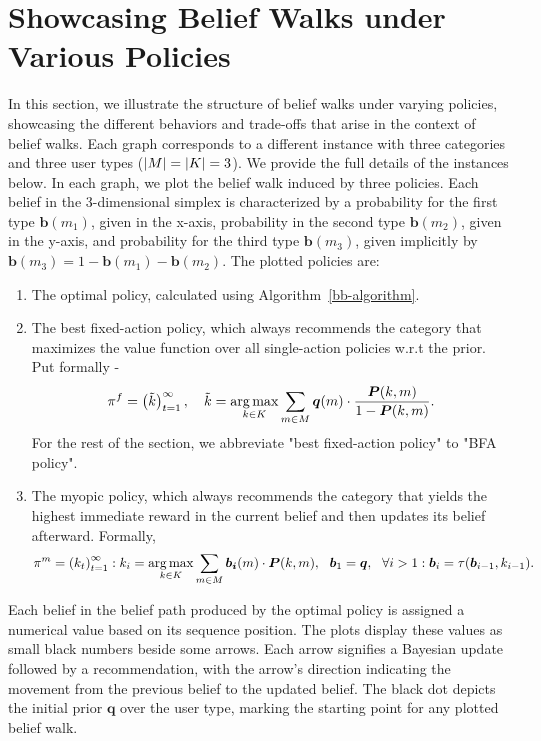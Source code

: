 \section{Showcasing Belief Walks under Various Policies} \label{sec:belief walks}
In this section, we illustrate the structure of belief walks under varying policies, showcasing the different behaviors and trade-offs that arise in the context of belief walks. Each graph corresponds to a different instance with three categories and three user types ($\lvert M\rvert = \lvert K\rvert = 3$). We provide the full details of the instances below. In each graph, we plot the belief walk induced by three policies. Each belief in the 3-dimensional simplex is characterized by a probability for the first type $\bm b(m_1)$, given in the x-axis, probability in the second type $\bm b(m_2)$, given in the y-axis, and probability for the third type $\bm b(m_3)$, given implicitly by $\bm b(m_3) = 1 -\bm b(m_1) - \bm b(m_2)$. The plotted policies are:
\begin{enumerate}
\item The optimal policy, calculated using Algorithm~\ref{bb-algorithm}.
\item The best fixed-action policy, which always recommends the category that maximizes the value function over all single-action policies w.r.t the prior. Put formally - \[ \pi^f = \left( \tilde k \right)_{t=1}^{\infty}, \quad \tilde k = \operatorname*{arg\,max}_{k \in K} \sum_{m \in M} \bm{q}(m) \cdot \frac{\bm{P}(k, m)}{1 - \bm{P}(k, m)}. \]
For the rest of the section, we abbreviate "best fixed-action policy" to "BFA policy".
\item The myopic policy, which always recommends the category that yields the highest immediate reward in the current belief and then updates its belief afterward. Formally, \[ \pi^m = \left( k_t \right)_{t=1}^{\infty}: k_i = \operatorname*{arg\,max}_{k \in K} \sum_{m \in M} \bm{b_i}(m) \cdot \bm{P}(k, m), \ \ \bm b_1 = \bm q, \ \ \forall i > 1: \bm b_i = \tau(\bm b_{i-1}, k_{i-1}). \]
\end{enumerate}

Each belief in the belief path produced by the optimal policy is assigned a numerical value based on its sequence position. The plots display these values as small black numbers beside some arrows. Each arrow signifies a Bayesian update followed by a recommendation, with the arrow's direction indicating the movement from the previous belief to the updated belief. The black dot depicts the initial prior $\bm q$ over the user type, marking the starting point for any plotted belief walk.


